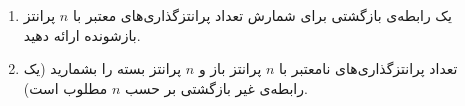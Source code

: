 \EXERCISE
\begin{enumerate}
\item
یک رابطه‌ی بازگشتی برای شمارش تعداد پرانتزگذاری‌های معتبر با
$n$
پرانتز بازشونده ارائه دهید.
\item
تعداد پرانتزگذاری‌های نامعتبر با
$n$
پرانتز باز و
$n$
پرانتز بسته را بشمارید (یک رابطه‌ی غیر بازگشتی بر حسب
$n$
مطلوب است).
\end{enumerate}